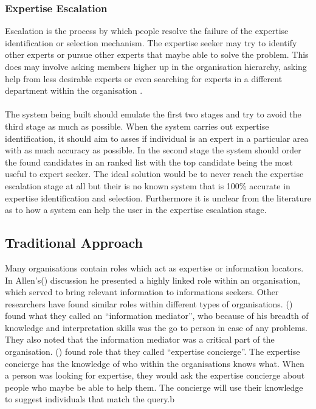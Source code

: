\documentclass[a4paper,oneside,11pt]{report}
\begin{document}
\subsubsection{Expertise Escalation} 
Escalation is the process by which people resolve the failure of the expertise identification or selection mechanism. The expertise seeker may try to identify other experts or pursue other experts that maybe able to solve the problem.  This does may involve asking members higher up in the organisation hierarchy, asking help from less desirable experts or even searching for experts in a different department within the organisation \autocite{mcdonalackerman1998}.
\\
\\
The system being built should emulate the first two stages and try to avoid the third stage as much as possible. When the system carries out expertise identification, it should aim to asses if individual is an expert in a particular area with as much accuracy as possible. In the second stage the system should order the found candidates in an ranked list with the top candidate being the most useful to expert seeker. The ideal solution would be to never reach the expertise escalation stage at all but their is no known system that is 100\% accurate in expertise identification and selection. Furthermore it is unclear from the literature as to how a system can help the user in the expertise escalation stage.

\subsection{Traditional Approach}
Many organisations contain roles which act as expertise or information locators.
In Allen's(\citeyear{allen1977}) discussion he presented a highly linked role within an organisation, which served to bring relevant information to informations seekers. Other researchers have found similar roles within different types of organisations. \citeauthor{ehrlichcash1994}(\citeyear{ehrlichcash1994}) found what they called an \enquote{information mediator}, who because of his breadth of knowledge and interpretation skills was the go to person in case of any problems. They also noted that the information mediator was a critical part of the organisation. \citeauthor{mcdonalackerman1998}(\citeyear{mcdonalackerman1998}) found role that they called \enquote{expertise concierge}. The expertise concierge has the knowledge of who within the organisations knows what. When a person was looking for expertise, they would ask the expertise concierge about people who maybe be able to help them. The concierge will use their knowledge to suggest individuals that match the query.b 
\end{document}
